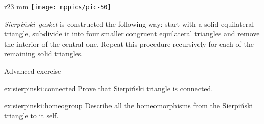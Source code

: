 {

\begin{wrapfigure}{r}{23 mm}
\vskip-4mm
\centering
\texttt{[image: mppics/pic-50]}
\end{wrapfigure}

\mbox{\emph{Sierpi\'nski gasket}} is constructed the following way:
start with a solid equilateral triangle, subdivide it into four smaller congruent equilateral triangles and remove the interior of the central one.
Repeat this procedure recursively for each of the remaining solid triangles.

}


\begin{thm}{Advanced exercise}\label{ex:sierpinski}

\begin{subthm}{ex:sierpinski:connected}
Prove that Sierpi\'nski triangle is connected.
\end{subthm}

\begin{subthm}{ex:sierpinski:homeogroup}
Describe all the homeomorphisms from the Sierpi\'nski triangle to it self.
\end{subthm}

\end{thm}
